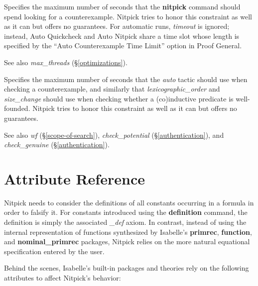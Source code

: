 \documentclass[a4paper,12pt]{article}
\begin{document}
\begin{enum}
Specifies the maximum number of seconds that the \textbf{nitpick} command should
spend looking for a counterexample. Nitpick tries to honor this constraint as
well as it can but offers no guarantees. For automatic runs,
\textit{timeout} is ignored; instead, Auto Quickcheck and Auto Nitpick share
a time slot whose length is specified by the ``Auto Counterexample Time
Limit'' option in Proof General.

\nopagebreak
{\small See also \textit{max\_threads} (\S\ref{optimizations}).}

Specifies the maximum number of seconds that the \textit{auto} tactic should use
when checking a counterexample, and similarly that \textit{lexicographic\_order}
and \textit{size\_change} should use when checking whether a (co)in\-duc\-tive
predicate is well-founded. Nitpick tries to honor this constraint as well as it
can but offers no guarantees.

\nopagebreak
{\small See also \textit{wf} (\S\ref{scope-of-search}),
\textit{check\_potential} (\S\ref{authentication}),
and \textit{check\_genuine} (\S\ref{authentication}).}
\end{enum}

\section{Attribute Reference}
\label{attribute-reference}

Nitpick needs to consider the definitions of all constants occurring in a
formula in order to falsify it. For constants introduced using the
\textbf{definition} command, the definition is simply the associated
\textit{\_def} axiom. In contrast, instead of using the internal representation
of functions synthesized by Isabelle's \textbf{primrec}, \textbf{function}, and
\textbf{nominal\_primrec} packages, Nitpick relies on the more natural
equational specification entered by the user.

Behind the scenes, Isabelle's built-in packages and theories rely on the
following attributes to affect Nitpick's behavior:
\end{document}

